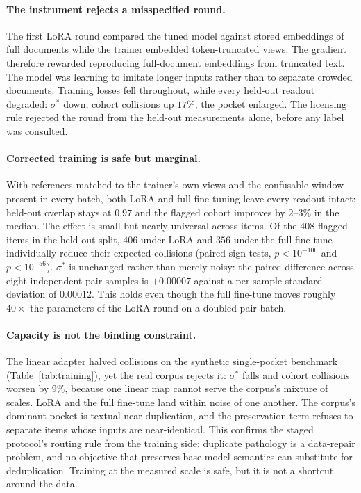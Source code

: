 \documentclass[11pt,letterpaper]{article}
\newcommand{\sstar}{\sigma^{*}}
\begin{document}
\paragraph{The instrument rejects a misspecified round.}
The first LoRA round compared the tuned model against stored embeddings of
full documents while the trainer embedded token-truncated views. The
gradient therefore rewarded reproducing full-document embeddings from
truncated text. The model was learning to imitate longer inputs rather than to
separate crowded documents. Training losses fell throughout, while every
held-out readout degraded: $\sstar$ down, cohort collisions up $17\%$, the
pocket enlarged. The licensing rule rejected the round from the held-out
measurements alone, before any label was consulted.

\paragraph{Corrected training is safe but marginal.}
With references matched to the trainer's own views and the confusable
window present in every batch, both LoRA and full fine-tuning leave every
readout intact: held-out overlap stays at $0.97$ and the flagged cohort
improves by $2$--$3\%$ in the median. The effect is small but nearly
universal across items. Of the $408$ flagged items in the held-out split,
$406$ under LoRA and $356$ under the full fine-tune individually reduce
their expected collisions (paired sign tests, $p < 10^{-100}$ and $p <
10^{-56}$). $\sstar$ is unchanged rather than merely noisy: the paired
difference across eight independent pair samples is $+0.00007$ against a
per-sample standard deviation of $0.00012$. This holds even though the
full fine-tune moves roughly $40\times$ the parameters of the LoRA round
on a doubled pair batch.

\paragraph{Capacity is not the binding constraint.}
The linear adapter halved collisions on the synthetic single-pocket
benchmark (Table~\ref{tab:training}), yet the real corpus rejects it:
$\sstar$ falls and cohort collisions worsen by $9\%$, because one linear
map cannot serve the corpus's mixture of scales. LoRA and the full
fine-tune land within noise of one another. The corpus's dominant pocket
is textual near-duplication, and the preservation term refuses to separate
items whose inputs are near-identical. This confirms the staged protocol's
routing rule from the training side: duplicate pathology is a data-repair
problem, and no objective that preserves base-model semantics can
substitute for deduplication. Training at the measured scale is safe, but
it is not a shortcut around the data.
\end{document}
